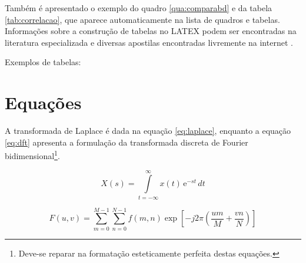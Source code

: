 Também é apresentado o exemplo do quadro \ref{qua:comparabd} e da tabela \ref{tab:correlacao}, que aparece automaticamente na lista de quadros e tabelas.
Informações sobre a construção de tabelas no LATEX podem ser encontradas na literatura especializada e diversas apostilas encontradas livremente na internet  \cite{Lamport1986,Buerger1989,reginaldo,camargo}.


\newpage
Exemplos de tabelas:





\section{Equações}
\label{sec:equacoes}

A transformada de Laplace é dada na equação \ref{eq:laplace}, enquanto a equação \ref{eq:dft} apresenta a formulação da transformada discreta de Fourier bidimensional\footnote{Deve-se reparar na formatação esteticamente perfeita destas equações.}.

\begin{equation}
	X(s) = \int\limits_{t = -\infty}^{\infty} x(t) \, \text{e}^{-st} \, dt
	\label{eq:laplace}
\end{equation}

\begin{equation}
	F(u, v) = \sum_{m = 0}^{M - 1} \sum_{n = 0}^{N - 1} f(m, n) \exp \left[ -j 2 \pi \left( \frac{u m}{M} + \frac{v n}{N} \right) \right]
	\label{eq:dft}
\end{equation}


